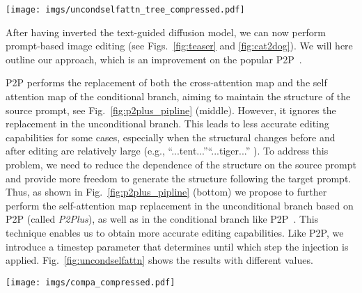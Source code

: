 \documentclass[twocolumn]{svjour3}          \smartqed  \usepackage{graphicx}
\begin{document}
\begin{figure*}[t]
\vspace{-2mm}
   \centering
\texttt{[image: imgs/uncondselfattn\_tree\_compressed.pdf]}
       \caption{\emph{P2P} (the second column: w/o ) has not succeeded in replacing the tent with the tiger.
       Adding the injection parameter  can help to edit successfully, especially if .
       We also use the classifier-free guidance parameter  like SD, when the weight  of the unconditional branch is negative~\citep{armandpour2023re,Tumanyan_2023_CVPR}, which can gradually weaken the influence of the "tent" in the unconditional branch as  increases from 0.2 to 1.0 (third to eighth columns).}
   \label{fig:uncondselfattn}
\end{figure*}


After having inverted the text-guided diffusion model, we can now perform prompt-based image editing (see Figs.~\ref{fig:teaser} and \ref{fig:cat2dog}). We will here outline our approach, which is an improvement on the popular P2P~\citep{hertz2022prompt}.

P2P performs the replacement of both the cross-attention map and the self attention map of the conditional branch,  aiming to maintain the structure of the source prompt, see Fig.~\ref{fig:p2plus_pipline} (middle). However, it  ignores the replacement in the unconditional branch. This leads to less accurate editing capabilities for some cases, especially when the structural changes before and after editing 
are relatively large (e.g., “...tent...”“...tiger...” ).  To address this problem, we need to reduce the dependence of the structure on the source prompt and provide more freedom to generate the structure following the target prompt. Thus, as shown in Fig.~\ref{fig:p2plus_pipline} (bottom) we propose to further perform the self-attention map replacement in  the unconditional branch based on P2P (called \textit{P2Plus}), as well as in the conditional branch like P2P~\citep{hertz2022prompt}.   This technique enables us to obtain more accurate editing capabilities.  Like P2P, we introduce   a timestep parameter  that determines until which step the injection is applied. Fig.~\ref{fig:uncondselfattn} shows the results with different    values. 
 


\begin{figure*}
    \centering
    \texttt{[image: imgs/compa\_compressed.pdf]}
    \vspace{-10pt}
    \caption{Comparisons with different baselines for real images.  
        Our method, achieves realistic editing of both style and structured objects, while preserving the structure of the input image (last column).  }
    \label{fig:cat2dog}
\end{figure*}
\end{document}

